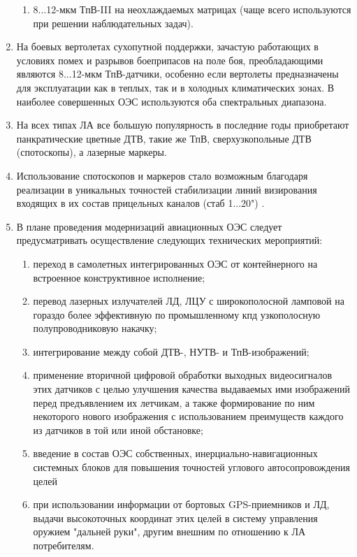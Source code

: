 \begin{enumerate}
\begin{enumerate}
		
		\item 8...12-мкм ТпВ-III на неохлаждаемых матрицах (чаще всего используются при решении наблюдательных задач).
	\end{enumerate}
	\item На боевых вертолетах сухопутной поддержки, зачастую работающих в условиях помех и разрывов боеприпасов на поле боя, преобладающими являются 8...12-мкм ТпВ-датчики, особенно если вертолеты предназначены для эксплуатации как в теплых, так и в холодных климатических зонах. В наиболее совершенных ОЭС используются оба спектральных диапазона. 
	\item На всех типах ЛА все большую популярность в последние годы приобретают панкратические цветные ДТВ, такие же ТпВ, сверхузкопольные ДТВ (спотоскопы), а лазерные маркеры. 
	\item Использование спотоскопов и маркеров стало возможным благодаря реализации в уникальных точностей стабилизации линий визирования входящих в их состав прицельных каналов (стаб 1...20") .
	\item В плане проведения модернизаций авиационных ОЭС следует предусматривать осуществление следующих технических мероприятий: 
	\begin{enumerate}
		\item переход в самолетных интегрированных ОЭС от контейнерного на встроенное конструктивное исполнение; 
		\item перевод лазерных излучателей ЛД, ЛЦУ с широкополосной ламповой на гораздо более эффективную по промышленному кпд узкополосную полупроводниковую накачку; 
		\item интегрирование между собой ДТВ-, НУТВ- и ТпВ-изображений; 
		\item применение вторичной цифровой обработки выходных видеосигналов этих датчиков с целью улучшения качества выдаваемых ими изображений перед предъявлением их летчикам, а также формирование по ним некоторого нового изображения с использованием преимуществ каждого из датчиков в той или иной обстановке; 
		\item введение в состав ОЭС собственных, инерциально-навигационных системных блоков для повышения точностей углового автосопровождения целей
		\item при использовании информации от бортовых GPS-приемников и ЛД, выдачи высокоточных координат этих целей в систему управления оружием "дальней руки", другим внешним по отношению к ЛА потребителям.  
	\end{enumerate}
\end{enumerate}


